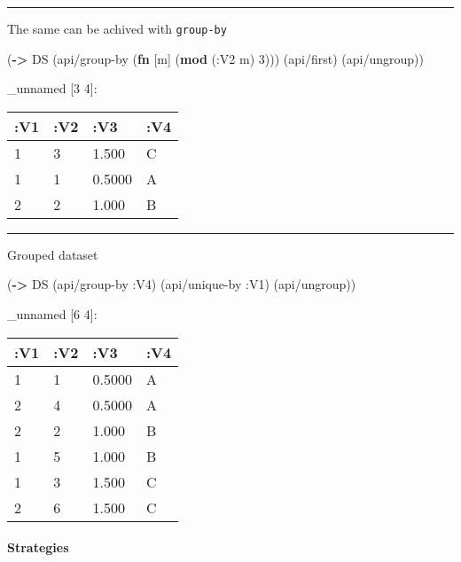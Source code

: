 \documentclass[]{article}
\newenvironment{Shaded}{\begin{snugshade}}{\end{snugshade}}
\newcommand{\KeywordTok}[1]{\textcolor[rgb]{0.13,0.29,0.53}{\textbf{#1}}}
\newcommand{\DecValTok}[1]{\textcolor[rgb]{0.00,0.00,0.81}{#1}}
\newcommand{\AttributeTok}[1]{\textcolor[rgb]{0.77,0.63,0.00}{#1}}
\newcommand{\NormalTok}[1]{#1}
\let\oldparagraph\paragraph
\renewcommand{\paragraph}[1]{\oldparagraph{#1}\mbox{}}
\begin{document}
\begin{center}\rule{0.5\linewidth}{0.5pt}\end{center}

The same can be achived with \texttt{group-by}

\begin{Shaded}
\begin{Highlighting}[]
\NormalTok{(}\KeywordTok{->}\NormalTok{ DS}
\NormalTok{    (api/group-by (}\KeywordTok{fn}\NormalTok{ [m] (}\KeywordTok{mod}\NormalTok{ (}\AttributeTok{:V2}\NormalTok{ m) }\DecValTok{3}\NormalTok{)))}
\NormalTok{    (api/first)}
\NormalTok{    (api/ungroup))}
\end{Highlighting}
\end{Shaded}

\_unnamed {[}3 4{]}:

\begin{longtable}[]{@{}llll@{}}
\toprule
:V1 & :V2 & :V3 & :V4\tabularnewline
\midrule
\endhead
1 & 3 & 1.500 & C\tabularnewline
1 & 1 & 0.5000 & A\tabularnewline
2 & 2 & 1.000 & B\tabularnewline
\bottomrule
\end{longtable}

\begin{center}\rule{0.5\linewidth}{0.5pt}\end{center}

Grouped dataset

\begin{Shaded}
\begin{Highlighting}[]
\NormalTok{(}\KeywordTok{->}\NormalTok{ DS}
\NormalTok{    (api/group-by }\AttributeTok{:V4}\NormalTok{)}
\NormalTok{    (api/unique-by }\AttributeTok{:V1}\NormalTok{)}
\NormalTok{    (api/ungroup))}
\end{Highlighting}
\end{Shaded}

\_unnamed {[}6 4{]}:

\begin{longtable}[]{@{}llll@{}}
\toprule
:V1 & :V2 & :V3 & :V4\tabularnewline
\midrule
\endhead
1 & 1 & 0.5000 & A\tabularnewline
2 & 4 & 0.5000 & A\tabularnewline
2 & 2 & 1.000 & B\tabularnewline
1 & 5 & 1.000 & B\tabularnewline
1 & 3 & 1.500 & C\tabularnewline
2 & 6 & 1.500 & C\tabularnewline
\bottomrule
\end{longtable}

\paragraph{Strategies}\label{strategies}
\end{document}
